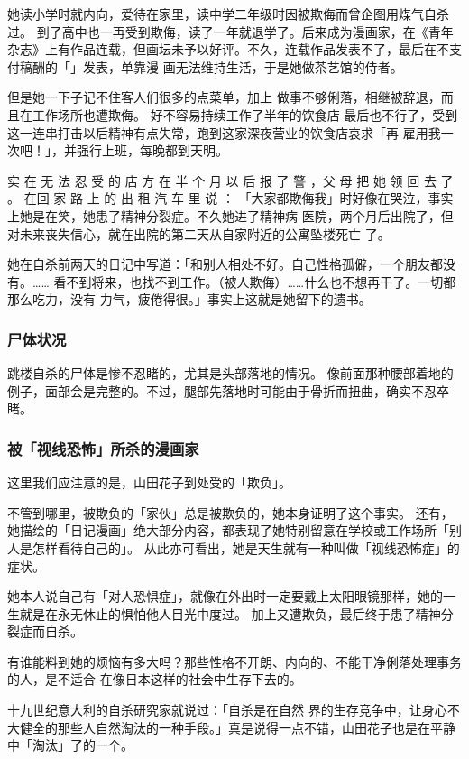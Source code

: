\documentclass[UTF8]{ctexart}
\begin{document}
她读小学时就内向，爱待在家里，读中学二年级时因被欺侮而曾企图用煤气自杀过。
到了高中也一再受到欺侮，读了一年就退学了。后来成为漫画家，在《青年杂志》上有作品连载，但画坛未予以好评。不久，连载作品发表不了，最后在不支付稿酬的「\qquad \qquad 」发表，单靠漫 画无法维持生活，于是她做茶艺馆的侍者。

但是她一下子记不住客人们很多的点菜单，加上 做事不够俐落，相继被辞退，而且在工作场所也遭欺侮。
好不容易持续工作了半年的饮食店 最后也不行了，受到这一连串打击以后精神有点失常，跑到这家深夜营业的饮食店哀求「再 雇用我一次吧！」，并强行上班，每晚都到天明。

实 在 无 法 忍 受 的 店 方 在 半 个 月 以 后 报 了 警 ，父 母 把 她 领 回 去 了 。
在回 家 路 上 的 出 租 汽 车 里 说 ： 「大家都欺侮我」时好像在哭泣，事实上她是在笑，她患了精神分裂症。不久她进了精神病 医院，两个月后出院了，但对未来丧失信心，就在出院的第二天从自家附近的公寓坠楼死亡 了。

她在自杀前两天的日记中写道：「和别人相处不好。自己性格孤僻，一个朋友都没有。…… 看不到将来，也找不到工作。（被人欺侮）……什么也不想再干了。一切都那么吃力，没有 力气，疲倦得很。」事实上这就是她留下的遗书。

\subsubsection*{尸体状况}

跳楼自杀的尸体是惨不忍睹的，尤其是头部落地的情况。
像前面那种腰部着地的例子，面部会是完整的。不过，腿部先落地时可能由于骨折而扭曲，确实不忍卒睹。

\subsubsection*{被「视线恐怖」所杀的漫画家}

这里我们应注意的是，山田花子到处受的「欺负」。

不管到哪里，被欺负的「家伙」总是被欺负的，她本身证明了这个事实。
还有，她描绘的「日记漫画」绝大部分内容，都表现了她特别留意在学校或工作场所「别人是怎样看待自己的」。
从此亦可看出，她是天生就有一种叫做「视线恐怖症」的症状。

她本人说自己有「对人恐惧症」，就像在外出时一定要戴上太阳眼镜那样，她的一生就是在永无休止的惧怕他人目光中度过。
加上又遭欺负，最后终于患了精神分裂症而自杀。

有谁能料到她的烦恼有多大吗？那些性格不开朗、内向的、不能干净俐落处理事务的人，是不适合 在像日本这样的社会中生存下去的。

十九世纪意大利的自杀研究家就说过：「自杀是在自然 界的生存竞争中，让身心不大健全的那些人自然淘汰的一种手段。」真是说得一点不错，山田花子也是在平静中「淘汰」了的一个。 
\end{document}
